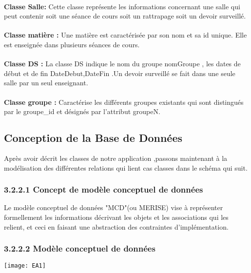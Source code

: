 \documentclass[a4paper,12pt,oneside]{report}
\begin{document}
 \\
\textbf{Classe Salle: }
Cette classe représente les informations concernant une salle qui peut contenir soit une séance de cours soit un rattrapage soit un devoir surveillé. \\
\\
\textbf{Classe matière : }
Une matière est caractérisée par son nom et sa id unique. Elle est enseignée dans plusieurs séances de cours. \\
 \\
\textbf{Classe DS : }
La classe DS indique le nom du groupe  nomGroupe , les dates de début et de fin DateDebut,DateFin .Un devoir surveillé se fait dans une seule salle par un seul enseignant.\\
\\
\textbf{Classe groupe :}
Caractérise les différents groupes existants qui sont distingués par le groupe\_id et désignés par l'attribut groupeN.
   \subsection{Conception de la Base de Données}
  Après avoir décrit les classes de notre application ,passons maintenant à la modélisation des différentes relations qui lient cas classes dans le schéma qui suit.
  \subsubsection{3.2.2.1 Concept de modèle conceptuel de données}
  Le modèle conceptuel de données "MCD"(ou MERISE) vise à représenter formellement les informations décrivant les objets et les associations qui les relient, et ceci en faisant une abstraction des contraintes d'implémentation.
  \subsubsection{3.2.2.2 Modèle conceptuel de données}
  \newpage
  
    \begin{center}
\texttt{[image: EA1]}

\label{fig1}
\end{center}
\end{document}
